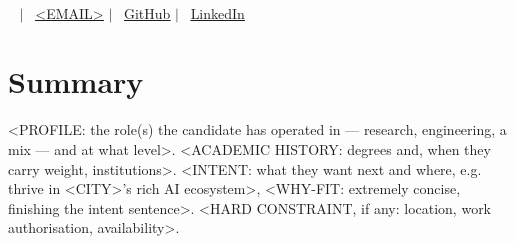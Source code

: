 \documentclass[letterpaper,9pt]{extarticle}   %
\begin{document}
\begin{center}
    {\sffamily\bfseries{}} \\ \vspace{4pt}
    \small
    \faPhone* \ <+PHONE> \quad $|$ \quad
    \faEnvelope[regular] \ \href{mailto:<EMAIL>}{\underline{<EMAIL>}} \quad $|$ \quad
    \faGithub \ \href{https://github.com/<HANDLE>}{\underline{GitHub}} \quad $|$ \quad
    \faLinkedin \ \href{https://www.linkedin.com/in/<HANDLE>/}{\underline{LinkedIn}}
\end{center}
\vspace{-12pt}

\section{Summary}
\vspace{2pt}
\small{<PROFILE: the role(s) the candidate has operated in — research,
engineering, a mix — and at what level>. <ACADEMIC HISTORY: degrees and, when
they carry weight, institutions>. <INTENT: what they want next and where,
e.g. thrive in <CITY>'s rich AI ecosystem>, <WHY-FIT: extremely concise,
finishing the intent sentence>. <HARD CONSTRAINT, if any: location, work
authorisation, availability>.}
\vspace{-2pt}

\end{document}
